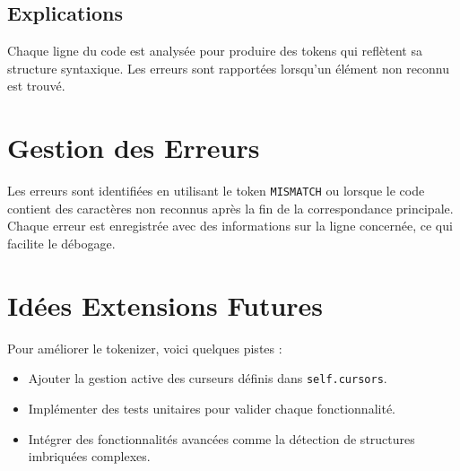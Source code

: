 \documentclass[12pt]{article}
\begin{document}
\subsection*{Explications}
Chaque ligne du code est analysée pour produire des tokens qui reflètent sa structure syntaxique. Les erreurs sont rapportées lorsqu'un élément non reconnu est trouvé.

\section{Gestion des Erreurs}
Les erreurs sont identifiées en utilisant le token \texttt{MISMATCH} ou lorsque le code contient des caractères non reconnus après la fin de la correspondance principale. Chaque erreur est enregistrée avec des informations sur la ligne concernée, ce qui facilite le débogage.

\section{Idées Extensions Futures}
Pour améliorer le tokenizer, voici quelques pistes :
\begin{itemize}
    \item Ajouter la gestion active des curseurs définis dans \texttt{self.cursors}.
    \item Implémenter des tests unitaires pour valider chaque fonctionnalité.
    \item Intégrer des fonctionnalités avancées comme la détection de structures imbriquées complexes.
\end{itemize}
\end{document}

